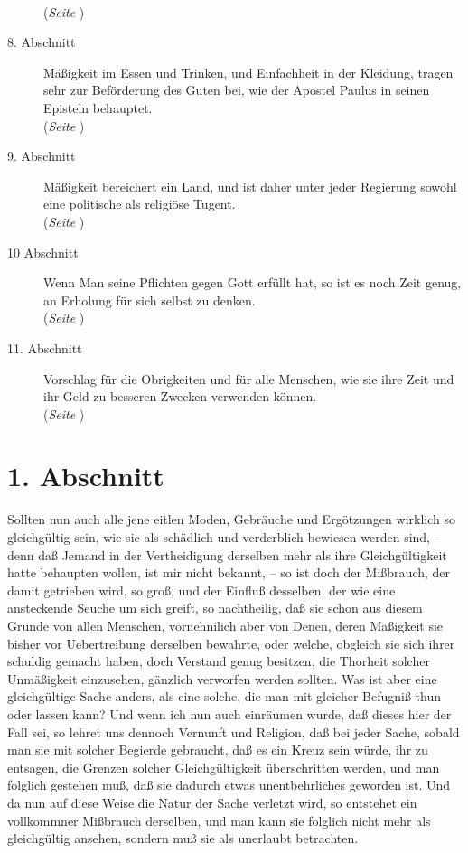 \begin{description}
\\(\textit{Seite \pageref{kap18_ab7}})
\item[8. Abschnitt] Mäßigkeit im Essen und Trinken, und Einfachheit in der
Kleidung, tragen sehr zur Beförderung des Guten bei, wie der Apostel Paulus in
seinen Episteln behauptet.
\\(\textit{Seite \pageref{kap18_ab8}})
\item[9. Abschnitt] Mäßigkeit bereichert ein Land, und ist daher unter jeder
Regierung sowohl eine politische als religiöse Tugent.
\\(\textit{Seite \pageref{kap18_ab9}})
\item[10 Abschnitt] Wenn Man seine Pflichten gegen Gott erfüllt hat, so ist es
noch Zeit genug, an Erholung für sich selbst zu denken.
\\(\textit{Seite \pageref{kap18_ab10}})
\item[11. Abschnitt] Vorschlag für die Obrigkeiten und für alle Menschen, wie
sie ihre Zeit und ihr Geld zu besseren Zwecken verwenden können.
\\(\textit{Seite \pageref{kap18_ab11}})

\end{description}
\normalsize

\section{1. Abschnitt} \label{kap18_ab1}

Sollten nun auch alle jene eitlen Moden, Gebräuche und Ergötzungen wirklich so
gleichgültig sein, wie sie als schädlich und verderblich bewiesen werden sind,
-- denn daß Jemand in der Vertheidigung derselben mehr als ihre Gleichgültigkeit
hatte behaupten wollen, ist mir nicht bekannt, -- so ist doch der Mißbrauch, der
damit getrieben wird, so groß, und der Einfluß desselben, der wie eine
ansteckende Seuche um sich greift, so nachtheilig, daß sie schon aus diesem
Grunde von allen Menschen, vornehnilich aber von Denen, deren Maßigkeit sie
bisher vor Uebertreibung derselben bewahrte, oder welche, obgleich sie sich
ihrer schuldig gemacht haben, doch Verstand genug besitzen, die Thorheit solcher
Unmäßigkeit einzusehen, gänzlich verworfen werden sollten. Was ist aber eine
gleichgültige Sache anders, als eine solche, die man mit gleicher Befugniß thun
oder lassen kann? Und wenn ich nun auch einräumen wurde, daß dieses hier der
Fall sei, so lehret uns dennoch Vernunft und Religion, daß bei jeder Sache,
sobald man sie mit solcher Begierde gebraucht, daß es ein Kreuz
sein würde, ihr
zu entsagen, die Grenzen solcher Gleichgültigkeit überschritten werden, und man
folglich gestehen muß, daß sie dadurch etwas unentbehrliches geworden ist. Und
da nun auf diese Weise die Natur der Sache verletzt wird, so entstehet ein
vollkommner Mißbrauch derselben, und man kann sie folglich nicht mehr als
gleichgültig ansehen, sondern muß sie als unerlaubt betrachten.

